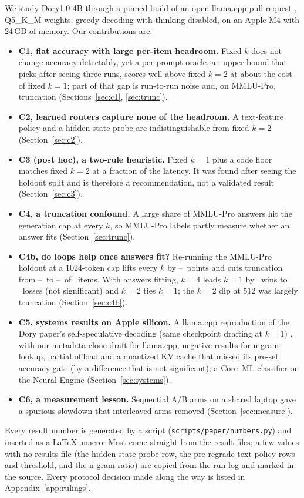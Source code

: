 \documentclass[11pt]{article}
\newcommand{\MemGb}{24}
\begin{document}
We study Dory1.0-4B \citep{dory2026,dorycard} through a pinned build of an open llama.cpp pull request \citep{llamacpp30306}, Q5\_K\_M weights, greedy decoding with thinking disabled, on an Apple M4 with \MemGb\,GB of memory. Our contributions are:
\begin{itemize}
\item \textbf{C1, flat accuracy with large per-item headroom.} Fixed $k$ does not change accuracy detectably, yet a per-prompt oracle, an upper bound that picks after seeing three runs, scores well above fixed $k{=}2$ at about the cost of fixed $k{=}1$; part of that gap is run-to-run noise and, on MMLU-Pro, truncation (Sections~\ref{sec:c1}, \ref{sec:trunc}).
\item \textbf{C2, learned routers capture none of the headroom.} A text-feature policy and a hidden-state probe are indistinguishable from fixed $k{=}2$ (Section~\ref{sec:c2}).
\item \textbf{C3 (post hoc), a two-rule heuristic.} Fixed $k{=}1$ plus a code floor matches fixed $k{=}2$ at a fraction of the latency. It was found after seeing the holdout split and is therefore a recommendation, not a validated result (Section~\ref{sec:c3}).
\item \textbf{C4, a truncation confound.} A large share of MMLU-Pro answers hit the generation cap at every $k$, so MMLU-Pro labels partly measure whether an answer fits (Section~\ref{sec:trunc}).
\item \textbf{C4b, do loops help once answers fit?} Re-running the MMLU-Pro holdout at a 1024-token cap lifts every $k$ by \MmluCapLiftMin--\MmluCapLiftMax\ points and cuts truncation from \MmluCapOneTruncSmallCap--\MmluCapTwoTruncSmallCap\ to \MmluCapOneTruncBigCap--\MmluCapTwoTruncBigCap\ of \MmluCapN\ items. With answers fitting, $k{=}4$ leads $k{=}1$ by \MmluCapFourWins\ wins to \MmluCapFourLosses\ losses (not significant) and $k{=}2$ ties $k{=}1$; the $k{=}2$ dip at 512 was largely truncation (Section~\ref{sec:c4b}).
\item \textbf{C5, systems results on Apple silicon.} A llama.cpp reproduction of the Dory paper's self-speculative decoding (same checkpoint drafting at $k{=}1$) \citep{dory2026}, with our metadata-clone draft for llama.cpp; negative results for n-gram lookup, partial offload and a quantized KV cache that missed its pre-set accuracy gate (by a difference that is not significant); a Core~ML classifier on the Neural Engine (Section~\ref{sec:systems}).
\item \textbf{C6, a measurement lesson.} Sequential A/B arms on a shared laptop gave a spurious slowdown that interleaved arms removed (Section~\ref{sec:measure}).
\end{itemize}
Every result number is generated by a script (\texttt{scripts/\allowbreak paper/\allowbreak numbers.py}) and inserted as a \LaTeX\ macro. Most come straight from the result files; a few values with no results file (the hidden-state probe row, the pre-regrade text-policy rows and threshold, and the n-gram ratio) are copied from the run log and marked in the source. Every protocol decision made along the way is listed in Appendix~\ref{app:rulings}.
\end{document}
